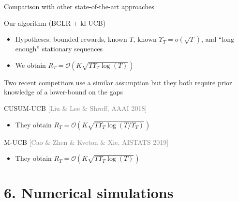 \documentclass[11pt,english,ignorenonframetext,]{beamer}
\begin{document}
\begin{frame}{Comparison with other state-of-the-art approaches}

  \begin{exampleblock}{Our algorithm (BGLR + kl-UCB)}
    \begin{itemize}
      \item Hypotheses: bounded rewards, known $T$, known $\Upsilon_T = o(\sqrt{T})$, and ``long enough'' stationary sequences
      \item We obtain $R_T = \mathcal{O}(K \sqrt{T \Upsilon_T \log(T)})$
    \end{itemize}
  \end{exampleblock}

  \pause
  Two recent competitors
  use a similar assumption
  \alert{but they both require prior knowledge of a lower-bound on the gaps}


  \begin{block}{CUSUM-UCB \hfill{} \textcolor{gray}{[Liu \& Lee \& Shroff, AAAI 2018]}}
    \begin{itemize}
      \item They obtain $R_T = \mathcal{O}(K \sqrt{T \Upsilon_T \log(T / \Upsilon_T)})$
    \end{itemize}
  \end{block}

  \begin{block}{M-UCB \hfill{} \textcolor{gray}{[Cao \& Zhen \& Kveton \& Xie, AISTATS 2019]}}
    \begin{itemize}
      \item They obtain $R_T = \mathcal{O}(K \sqrt{T \Upsilon_T \log(T)})$
    \end{itemize}
  \end{block}

\end{frame}


\section{\hfill{}6. Numerical simulations\hfill{}}
\end{document}

